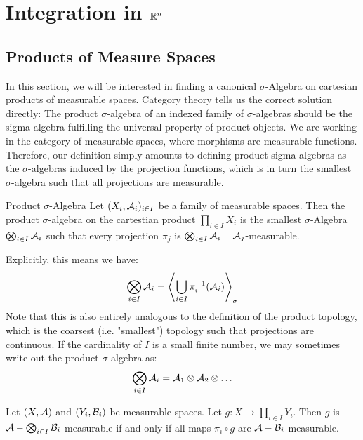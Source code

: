 \chapter{Integration in $\mathbb{R}^n$}
\section{Products of Measure Spaces}
In this section, we will be interested in finding a canonical $\sigma$-Algebra on cartesian products of measurable spaces. Category theory tells us the correct solution directly: The product $\sigma$-algebra of an indexed family of $\sigma$-algebras should be the sigma algebra fulfilling the universal property of product objects.
\newpar
We are working in the category of measurable spaces, where morphisms are measurable functions.
Therefore, our definition simply amounts to defining product sigma algebras as the $\sigma$-algebras induced by the projection functions, which is in turn the smallest $\sigma$-algebra such that all projections are measurable. 
\begin{importantdefinition}{Product $\sigma$-Algebra}{}
	Let $(X_i, \mathcal{A}_i)_{i \in I}$ be a family of measurable spaces. Then the product $\sigma$-algebra on the cartestian product $\prod_{i \in I} X_i$ is the smallest $\sigma$-Algebra $\bigotimes_{i \in I} \mathcal{A}_i$ such that every projection $\pi_j$ is $\bigotimes_{i \in I} \mathcal{A}_i - \mathcal{A}_j$-measurable.
\end{importantdefinition}
Explicitly, this means we have:
\begin{align*}
	\bigotimes_{i \in I} \mathcal{A}_i = \left\langle \bigcup_{i \in I} \pi_i^{-1}(\mathcal{A}_i) \right\rangle_\sigma
\end{align*}
Note that this is also entirely analogous to the definition of the product topology, which is the coarsest (i.e. "smallest") topology such that projections are continuous.
\newpar
If the cardinality of $I$ is a small finite number, we may sometimes write out the product $\sigma$-algebra as:
\begin{align*}
	\bigotimes_{i \in I} \mathcal{A}_i = \mathcal{A}_1 \otimes \mathcal{A}_2 \otimes \hdots
\end{align*}
\begin{importanttheorem}{}{}
	Let $(X, \mathcal{A})$ and $(Y_i, \mathcal{B}_i)$ be measurable spaces. Let $g : X \to \prod_{i \in I} Y_i$. Then $g$ is $\mathcal{A}-\bigotimes_{i \in I} \mathcal{B}_i$-measurable if and only if all maps $\pi_i \circ g$ are $\mathcal{A}-\mathcal{B}_i$-measurable.
\end{importanttheorem}
